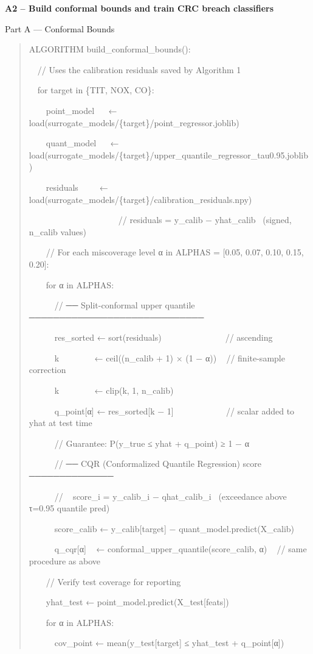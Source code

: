 \documentclass[11pt]{article}
\begin{document}
\textbf{A2 -- Build conformal bounds and train CRC breach classifiers}

Part A --- Conformal Bounds

\begin{quote}
ALGORITHM build\_conformal\_bounds():

~~// Uses the calibration residuals saved by Algorithm 1

~~for target in \{TIT, NOX, CO\}:

~~~~point\_model~ ~ ←
load(surrogate\_models/\{target\}/point\_regressor.joblib)

~~~~quant\_model~ ~ ←
load(surrogate\_models/\{target\}/upper\_quantile\_regressor\_tau0.95.joblib)

~~~~residuals~ ~ ~ ←
load(surrogate\_models/\{target\}/calibration\_residuals.npy)

~~~~~~~~~~~~~~~~~~~~~// residuals = y\_calib − yhat\_calib~ (signed,
n\_calib values)

~~~~// For each miscoverage level α in ALPHAS = {[}0.05, 0.07, 0.10,
0.15, 0.20{]}:

~~~~for α in ALPHAS:

~~~~~~// ── Split-conformal upper quantile ─────────────────────────────

~~~~~~res\_sorted ← sort(residuals)~ ~ ~ ~ ~ ~ ~ ~ ~ // ascending

~~~~~~k~ ~ ~ ~ ~ ← ceil((n\_calib + 1) × (1 − α)) ~ // finite-sample
correction

~~~~~~k~ ~ ~ ~ ~ ← clip(k, 1, n\_calib)

~~~~~~q\_point{[}α{]} ← res\_sorted{[}k − 1{]} ~ ~ ~ ~ ~ ~ ~ // scalar
added to yhat at test time

~~~~~~// Guarantee: P(y\_true ≤ yhat + q\_point) ≥ 1 − α

~~~~~~// ── CQR (Conformalized Quantile Regression) score ──────────────

~~~~~~// ~ score\_i = y\_calib\_i − qhat\_calib\_i~ (exceedance above
τ=0.95 quantile pred)

~~~~~~score\_calib ← y\_calib{[}target{]} −
quant\_model.predict(X\_calib)

~~~~~~q\_cqr{[}α{]} ~ ← conformal\_upper\_quantile(score\_calib, α) ~ //
same procedure as above

~~~~// Verify test coverage for reporting

~~~~yhat\_test ← point\_model.predict(X\_test{[}feats{]})

~~~~for α in ALPHAS:

~~~~~~cov\_point ← mean(y\_test{[}target{]} ≤ yhat\_test +
q\_point{[}α{]})


\end{quote}
\end{document}
